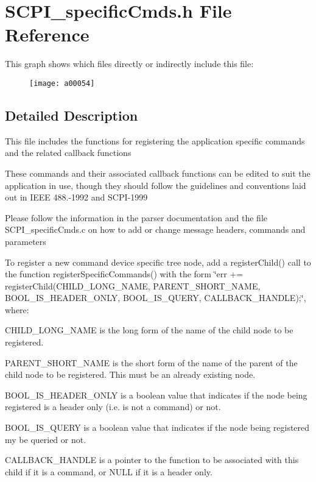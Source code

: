 \hypertarget{a00030}{\section{S\-C\-P\-I\-\_\-specific\-Cmds.\-h File Reference}
\label{a00030}
}
This graph shows which files directly or indirectly include this file\-:\nopagebreak
\begin{figure}[H]
\begin{center}
\leavevmode
\texttt{[image: a00054]}
\end{center}
\end{figure}


\subsection{Detailed Description}
This file includes the functions for registering the application specific commands and the related callback functions

These commands and their associated callback functions can be edited to suit the application in use, though they should follow the guidelines and conventions laid out in I\-E\-E\-E 488.-\/1992 and S\-C\-P\-I-\/1999

Please follow the information in the parser documentation and the file S\-C\-P\-I\-\_\-specific\-Cmds.\-c on how to add or change message headers, commands and parameters

To register a new command device specific tree node, add a register\-Child() call to the function register\-Specific\-Commands() with the form \char`\"{}err += register\-Child(\-C\-H\-I\-L\-D\-\_\-\-L\-O\-N\-G\-\_\-\-N\-A\-M\-E, P\-A\-R\-E\-N\-T\-\_\-\-S\-H\-O\-R\-T\-\_\-\-N\-A\-M\-E,
\-B\-O\-O\-L\-\_\-\-I\-S\-\_\-\-H\-E\-A\-D\-E\-R\-\_\-\-O\-N\-L\-Y, B\-O\-O\-L\-\_\-\-I\-S\-\_\-\-Q\-U\-E\-R\-Y, C\-A\-L\-L\-B\-A\-C\-K\-\_\-\-H\-A\-N\-D\-L\-E);\char`\"{}, where\-:
\begin{DoxyItemize}
\item C\-H\-I\-L\-D\-\_\-\-L\-O\-N\-G\-\_\-\-N\-A\-M\-E is the long form of the name of the child node to be registered.
\item P\-A\-R\-E\-N\-T\-\_\-\-S\-H\-O\-R\-T\-\_\-\-N\-A\-M\-E is the short form of the name of the parent of the child node to be registered. This must be an already existing node.
\item B\-O\-O\-L\-\_\-\-I\-S\-\_\-\-H\-E\-A\-D\-E\-R\-\_\-\-O\-N\-L\-Y is a boolean value that indicates if the node being registered is a header only (i.\-e. is not a command) or not.
\item B\-O\-O\-L\-\_\-\-I\-S\-\_\-\-Q\-U\-E\-R\-Y is a boolean value that indicates if the node being registered my be queried or not.
\item C\-A\-L\-L\-B\-A\-C\-K\-\_\-\-H\-A\-N\-D\-L\-E is a pointer to the function to be associated with this child if it is a command, or N\-U\-L\-L if it is a header only.
\end{DoxyItemize}

